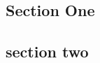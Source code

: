 \documentclass[11pt, a4paper]{article}
\begin{document}
\lipsum[1]
\vspace{1cm}

\begin{paracol}{2}

\setlength{\columnseprule}{0.4pt}
\setlength{\columnsep}{2cm}

\begin{leftcolumn}
  \sloppy
  \section{Section One}
  \lipsum [1-2]
\end{leftcolumn}

\begin{rightcolumn}
  \section{section two}
  \leavevmode\llap{\smash{\color{white}\rule[\ht\strutbox]{\columnsep}{2cm}}}%
  \lipsum[3-4]
\end{rightcolumn}

\end{paracol}
\end{document}
